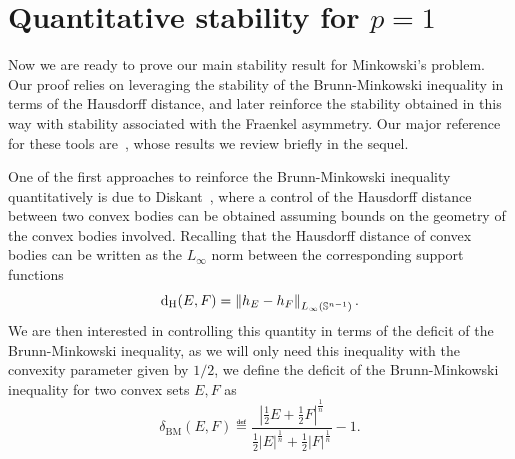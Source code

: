 \documentclass[a4paper, 10pt, twoside]{amsart}
\numberwithin{equation}{section}
\theoremstyle{plain}
\theoremstyle{definition}
\DeclareMathOperator{\BM}{\mathrm{BM}}
\DeclareMathOperator{\dH}{\mathrm{d}_\mathrm{H}}
\begin{document}


\section{Quantitative stability for $p=1$}\label{sec.case_p1}

Now we are ready to prove our main stability result for Minkowski's problem. Our proof relies on leveraging the stability of the Brunn-Minkowski inequality in terms of the Hausdorff distance, and later reinforce the stability obtained in this way with stability associated with the Fraenkel asymmetry. Our major reference for these tools are~\cite{diskant1972bounds,diskant1973stability,figalli2010stability}, whose results we review briefly in the sequel. 

One of the first approaches to reinforce the Brunn-Minkowski inequality quantitatively is due to Diskant~\cite{diskant1973stability}, where a control of the Hausdorff distance between two convex bodies can be obtained assuming bounds on the geometry of the convex bodies involved. Recalling that the Hausdorff distance of convex bodies can be written as the $L_\infty$ norm between the corresponding support functions 
\[
    \dH(E,F) = \norm{h_E - h_F}_{L_\infty(\mathbb{S}^{n-1})}. 
\]
We are then interested in controlling this quantity in terms of the deficit of the Brunn-Minkowski inequality, as we will only need this inequality with the convexity parameter given by $1/2$, we define the deficit of the Brunn-Minkowski inequality for two convex sets $E,F$ as 
\begin{equation}\label{eq.deficit_BM}
    \delta_{\BM}(E,F) 
    \eqdef 
    \frac{
        \left|\frac{1}{2}E + \frac{1}{2}F\right|^{\frac{1}{n}} 
    }{
        \frac{1}{2}|E|^{\frac{1}{n}} + 
        \frac{1}{2}|F|^{\frac{1}{n}}}
    - 1.
\end{equation}
\end{document}
